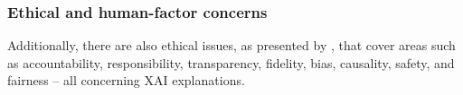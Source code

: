 
\subsubsection*{Ethical and human-factor concerns}
Additionally, there are also ethical issues, as presented by \cite{hanif2021survey}, that cover areas such as accountability, responsibility, transparency, fidelity, bias, causality, safety, and fairness -- all concerning XAI explanations.
